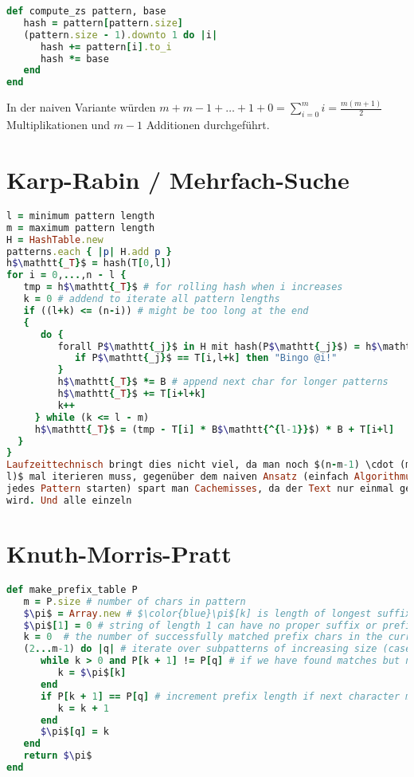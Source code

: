 \documentclass{article}
\begin{document}
\begin{lstlisting}[language=Ruby]
def compute_zs pattern, base
   hash = pattern[pattern.size]
   (pattern.size - 1).downto 1 do |i|
      hash += pattern[i].to_i
      hash *= base
   end
end
\end{lstlisting}

In der naiven Variante würden $m + m-1 + \ldots + 1 + 0 = \sum_{i=0}^m i =
\frac{m(m+1)}{2}$ Multiplikationen und $m-1$ Additionen durchgeführt.

\bigskip %

\section{Karp-Rabin / Mehrfach-Suche}

\begin{lstlisting}[language=Ruby,mathescape=true]
l = minimum pattern length
m = maximum pattern length
H = HashTable.new
patterns.each { |p| H.add p }
h$\mathtt{_T}$ = hash(T[0,l])
for i = 0,...,n - l {
   tmp = h$\mathtt{_T}$ # for rolling hash when i increases
   k = 0 # addend to iterate all pattern lengths
   if ((l+k) <= (n-i)) # might be too long at the end
   {
      do {
         forall P$\mathtt{_j}$ in H mit hash(P$\mathtt{_j}$) = h$\mathtt{_T}$ {
            if P$\mathtt{_j}$ == T[i,l+k] then "Bingo @i!"
         }
         h$\mathtt{_T}$ *= B # append next char for longer patterns
         h$\mathtt{_T}$ += T[i+l+k]
         k++
     } while (k <= l - m)
     h$\mathtt{_T}$ = (tmp - T[i] * B$\mathtt{^{l-1}}$) * B + T[i+l]
  }
}
Laufzeittechnisch bringt dies nicht viel, da man noch $(n-m-1) \cdot (m -
l)$ mal iterieren muss, gegenüber dem naiven Ansatz (einfach Algorithmus für
jedes Pattern starten) spart man Cachemisses, da der Text nur einmal geladen
wird. Und alle einzeln
\end{lstlisting}
\section{Knuth-Morris-Pratt}
\begin{lstlisting}[language=Ruby,mathescape=true]
def make_prefix_table P
   m = P.size # number of chars in pattern
   $\pi$ = Array.new # $\color{blue}\pi$[k] is length of longest suffix of P[1,...,k] that is also a proper prefix
   $\pi$[1] = 0 # string of length 1 can have no proper suffix or prefix
   k = 0  # the number of successfully matched prefix chars in the current suffix pattern
   (2...m-1) do |q| # iterate over subpatterns of increasing size (case q = 1 handled above)
      while k > 0 and P[k + 1] != P[q] # if we have found matches but next character mismatches the one we would attach to the prefix, back up. From the already constructed vector we know that $\color{blue}\pi[k]$ already contains the longest suffix of P[1,...,k] that is a prefix, so we set that as the number of matching characters as it is the next longest prefix conforming to the condition
         k = $\pi$[k]
      end
      if P[k + 1] == P[q] # increment prefix length if next character matches the one after the current longest prefix
         k = k + 1
      end
      $\pi$[q] = k 
   end
   return $\pi$
end
\end{lstlisting}
\end{document}
